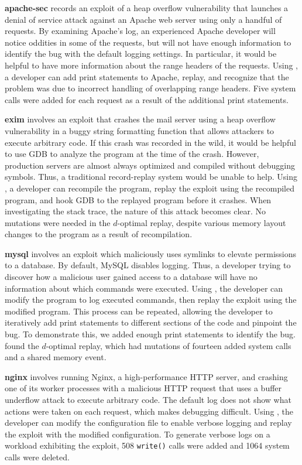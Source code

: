 {\bf apache-sec} records an exploit of a heap overflow
vulnerability that launches a denial of service attack against an Apache
web server using only a handful of requests. By examining Apache's log,
an experienced Apache developer will notice oddities in some of the requests,
but will not have enough information to identify the bug with the default
logging settings. In particular, it would be helpful to have more
information about the range headers of the requests. Using {\dora}, a
developer can add print statements to Apache, replay, and recognize that the
problem was due to incorrect handling of overlapping range headers. Five system
calls were added for each request as a result of the additional print
statements.

{\bf exim} involves an exploit that crashes the mail server using a
heap overflow vulnerability in a buggy string formatting function
that allows attackers to execute arbitrary code. If this crash was recorded in
the wild, it would be helpful to use GDB to analyze the program at the time of
the crash. However, production servers are almost always optimized and compiled
without debugging symbols. Thus, a traditional record-replay system would be
unable to help. Using {\dora}, a developer can recompile the
program, replay the exploit
using the recompiled program, and hook GDB to the replayed program
before it crashes. When investigating the stack trace, the nature of
this attack becomes clear. No mutations were needed in the $d$-optimal replay,
despite various memory layout changes to the program as a result of
recompilation.

{\bf mysql} involves an exploit which maliciously uses symlinks
to elevate permissions to a database. By default, MySQL disables
logging. Thus, a developer trying to discover how
a malicious user gained access to a database
will have no information about which commands
were executed. Using {\dora}, the developer can modify the program
to log executed commands, then replay the exploit
using the modified program. This process can be repeated, allowing
the developer to iteratively add print statements to different sections of the
code and pinpoint the bug. To demonstrate this, we added enough print statements
to identify the bug. {\dora} found the $d$-optimal replay, which had
mutations of fourteen added system calls and a shared memory event.

{\bf nginx} involves running Nginx, a high-performance HTTP server,
and crashing one of its worker processes with a malicious HTTP request
that uses a buffer underflow attack to execute arbitrary code.
The default log does not show what actions were taken on
each request, which makes debugging difficult. Using {\dora}, the
developer can modify the configuration file to enable verbose logging and
replay the exploit with the modified configuration.
To generate verbose logs on a workload exhibiting the exploit, 508 {\tt write()}
calls were added and 1064 system calls were deleted.


